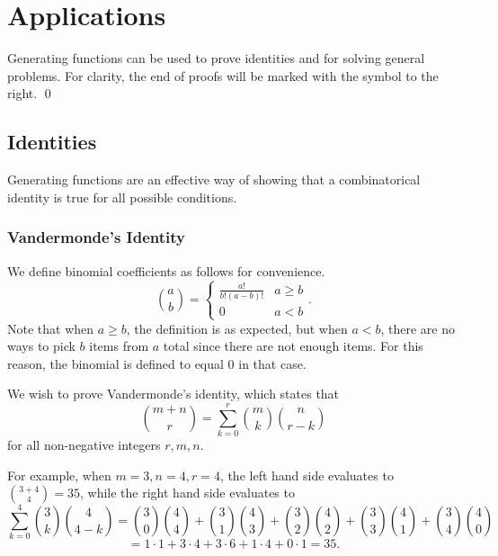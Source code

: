 \documentclass[12pt]{article}
\begin{document}
\section{Applications}
Generating functions can be used to prove identities and for solving general problems. For clarity, the end of proofs will be marked with the symbol to the right. \qed 
\subsection{Identities}
Generating functions are an effective way of showing that a combinatorical identity is true for all possible conditions.
\subsubsection{Vandermonde's Identity}
We define binomial coefficients as follows for convenience. \[ \binom{a}{b}= \begin{cases} 
      \frac{a!}{b! (a-b)!} & a\ge b \\
      0 & a< b 
   \end{cases}.
\] Note that when $a\ge b$, the definition is as expected, but when $a<b$, there are no ways to pick $b$ items from $a$ total since there are not enough items. For this reason, the binomial is defined to equal 0 in that case.

We wish to prove Vandermonde's identity, which states that \[\binom{m+n}{r}=\sum_{k=0}^{r}\binom{m}{k}\binom{n}{r-k}\]
for all non-negative integers $r, m, n$.

For example, when $m=3, n=4, r=4$, the left hand side evaluates to $\binom{3+4}{4}=35$, while the right hand side evaluates to \[\sum_{k=0}^{4} \binom{3}{k}\binom{4}{4-k}=\binom{3}{0}\binom{4}{4} + \binom{3}{1}\binom{4}{3}+\binom{3}{2}\binom{4}{2}+\binom{3}{3}\binom{4}{1}+\binom{3}{4}\binom{4}{0}\]\[=1\cdot1 + 3\cdot4+3\cdot6+1\cdot4+0\cdot1=35.\]
\end{document}

